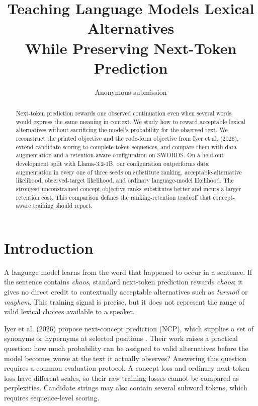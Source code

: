 \documentclass[11pt]{article}
\title{Teaching Language Models Lexical Alternatives\\
While Preserving Next-Token Prediction}
\author{Anonymous submission}
\begin{document}
\maketitle

\begin{abstract}
Next-token prediction rewards one observed continuation even when several words
would express the same meaning in context. We study how to reward acceptable
lexical alternatives without sacrificing the model's probability for the
observed text. We reconstruct the printed objective and the code-form objective
from Iyer et al. (2026), extend candidate scoring to complete token sequences,
and compare them with data augmentation and a retention-aware configuration on
SWORDS. On a held-out development split with Llama-3.2-1B, our configuration
outperforms data augmentation in every one of three seeds on substitute ranking,
acceptable-alternative likelihood, observed-target likelihood, and ordinary
language-model likelihood. The strongest unconstrained concept objective ranks
substitutes better and incurs a larger retention cost. This comparison defines
the ranking-retention tradeoff that concept-aware training should report.
\end{abstract}

\section{Introduction}

A language model learns from the word that happened to occur in a sentence. If
the sentence contains \emph{chaos}, standard next-token prediction rewards
\emph{chaos}; it gives no direct credit to contextually acceptable alternatives
such as \emph{turmoil} or \emph{mayhem}. This training signal is precise, but it
does not represent the range of valid lexical choices available to a speaker.

Iyer et al. (2026) propose next-concept prediction (NCP), which supplies a set of
synonyms or hypernyms at selected positions \citep{iyer2026beyond}. Their work
raises a practical question: how much probability can be assigned to valid
alternatives before the model becomes worse at the text it actually observes?
Answering this question requires a common evaluation protocol. A concept loss
and ordinary next-token loss have different scales, so their raw training losses
cannot be compared as perplexities. Candidate strings may also contain several
subword tokens, which requires sequence-level scoring.
\end{document}
